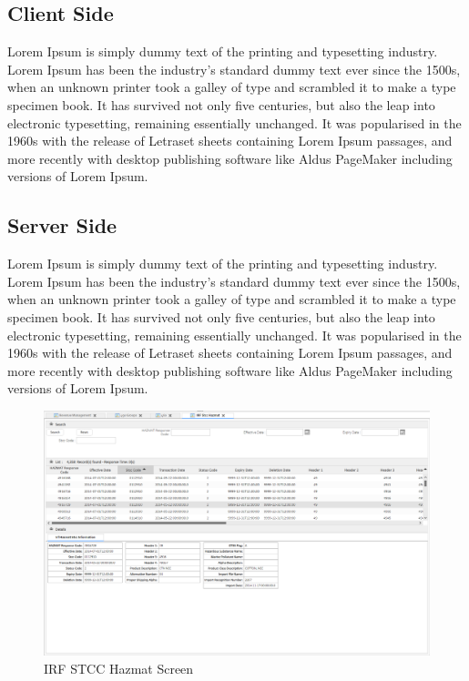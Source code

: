 \documentclass[12pt,a4paper]{report}
\begin{document}
\subsection{Client Side}

Lorem Ipsum is simply dummy text of the printing and typesetting industry. Lorem Ipsum has been the industry's standard dummy text ever since the 1500s, when an unknown printer took a galley of type and scrambled it to make a type specimen book. It has survived not only five centuries, but also the leap into electronic typesetting, remaining essentially unchanged. It was popularised in the 1960s with the release of Letraset sheets containing Lorem Ipsum passages, and more recently with desktop publishing software like Aldus PageMaker including versions of Lorem Ipsum.

\subsection{Server Side}
Lorem Ipsum is simply dummy text of the printing and typesetting industry. Lorem Ipsum has been the industry's standard dummy text ever since the 1500s, when an unknown printer took a galley of type and scrambled it to make a type specimen book. It has survived not only five centuries, but also the leap into electronic typesetting, remaining essentially unchanged. It was popularised in the 1960s with the release of Letraset sheets containing Lorem Ipsum passages, and more recently with desktop publishing software like Aldus PageMaker including versions of Lorem Ipsum.
\begin{figure}[H]
\centering
\includegraphics[scale=.5]{Hazmat.png}
  \caption{IRF STCC Hazmat Screen}
  \label{fig:Hazmat}
\end{figure}
\end{document}

